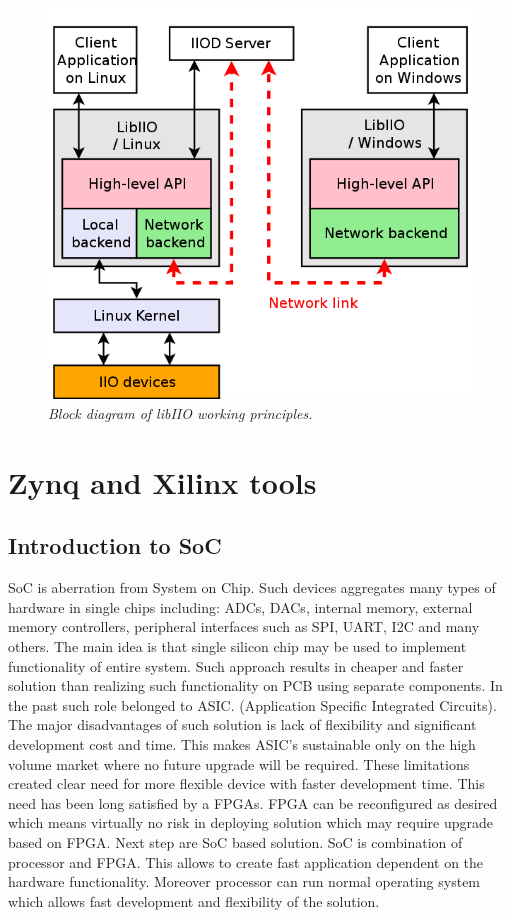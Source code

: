 \documentclass[en,printmode]{mgr}
\begin{document}
		
		\begin{figure}[!htb]
    		\centering
   			\includegraphics[width=\textwidth]{images/libiio_diagram.png}
   		 	\caption{\textit{Block diagram of libIIO working principles. \cite{libioo}}}
		\end{figure}
		
		\newpage
	\section{Zynq and Xilinx tools}
		\subsection*{Introduction to SoC}
		SoC is aberration from System on Chip. Such devices aggregates
		many types of hardware in single chips including: ADCs, DACs, internal memory, external 
		memory controllers, peripheral interfaces such as SPI, UART, I2C and many others. 
		The main idea is that single silicon chip may be
		used to implement functionality of entire system. Such approach results in cheaper and faster solution than
		realizing such functionality on PCB using separate components. In the past such role
		belonged to ASIC.
		(Application Specific Integrated Circuits). The major disadvantages of such solution is lack
		of flexibility and significant development cost and time. This makes ASIC's sustainable only
		on the high volume market where no future upgrade will be required. These limitations created
		clear need for more flexible device with faster development time. This need has been long
		satisfied by a FPGAs. FPGA can be reconfigured as desired which means virtually no risk in
		deploying solution which may require upgrade based on FPGA. Next step are SoC based solution.
		SoC is combination of processor and FPGA. This allows to create fast application dependent on the
		hardware functionality. Moreover processor can run normal operating system which allows fast
		development and flexibility of the solution.
		
\end{document}
